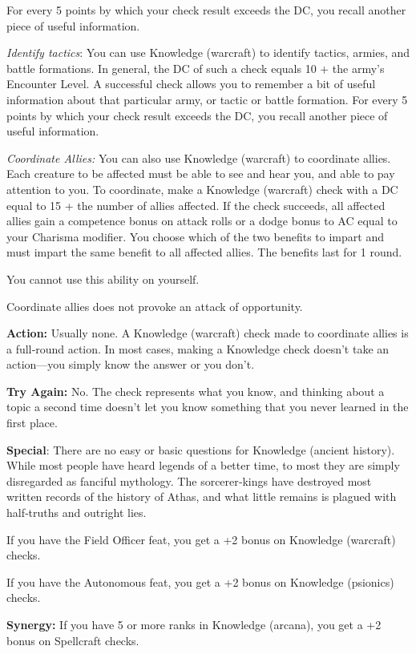 For every 5 points by which your check result exceeds the DC, you recall another piece of useful information.

\textit{Identify tactics}: You can use Knowledge (warcraft) to identify tactics, armies, and battle formations. In general, the DC of such a check equals 10 + the army's Encounter Level. A successful check allows you to remember a bit of useful information about that particular army, or tactic or battle formation. For every 5 points by which your check result exceeds the DC, you recall another piece of useful information.

\textit{Coordinate Allies:} You can also use Knowledge (warcraft) to coordinate allies. Each creature to be affected must be able to see and hear you, and able to pay attention to you. To coordinate, make a Knowledge (warcraft) check with a DC equal to 15 + the number of allies affected. If the check succeeds, all affected allies gain a competence bonus on attack rolls or a dodge bonus to AC equal to your Charisma modifier. You choose which
of the two benefits to impart and must impart the same benefit to all affected allies. The benefits last for 1 round.

You cannot use this ability on yourself.

Coordinate allies does not provoke an attack of opportunity.

\textbf{Action:} Usually none. A Knowledge (warcraft) check made to coordinate allies is a full‐round action. In most cases, making a Knowledge check doesn't take an action---you simply know the answer or you don't.

\textbf{Try Again:} No. The check represents what you know, and thinking about a topic a second time doesn't let you know something that you never learned in the first place.

\textbf{Special}: There are no easy or basic questions for Knowledge (ancient history). While most people have heard legends of a better time, to most they are simply disregarded as fanciful mythology. The sorcerer‐kings have destroyed most written records of the history of Athas, and what little remains is plagued with half‐truths and outright lies.

If you have the Field Officer feat, you get a +2 bonus on Knowledge (warcraft) checks.

If you have the Autonomous feat, you get a +2 bonus on Knowledge (psionics) checks.

\textbf{Synergy:} If you have 5 or more ranks in Knowledge (arcana), you get a +2 bonus on Spellcraft checks.

